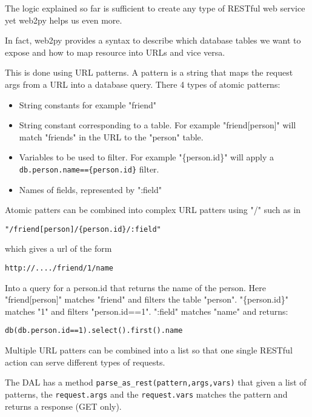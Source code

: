 \documentclass[justified,sixbynine,notoc]{tufte-book}
\def\ft{\small\tt}
\def\inxx#1{\index{#1}}
\begin{document}
\begin{fullwidth}
The logic explained so far is sufficient to create any type of RESTful web service yet web2py helps us even more.

In fact, web2py provides a syntax to describe which database tables we want to expose and how to map resource into URLs and vice versa.

\inxx{parse\_as\_rest}

This is done using URL patterns.
A pattern is a string that maps the request args from a URL into a database query.
There 4 types of atomic patterns:

\begin{itemize}
\item String constants for example "friend"

\item String constant corresponding to a table. For example "friend[person]" will match "friends" in the URL to the "person" table.

\item Variables to be used to filter. For example "\{person.id\}" will apply a {\ft db.person.name==\{person.id\}} filter.

\item Names of fields, represented by ":field"
\end{itemize}

Atomic patters can be combined into complex URL patters using "/" such as in

\begin{lstlisting}
"/friend[person]/{person.id}/:field"
\end{lstlisting}
\noindent which gives a url of the form

\begin{lstlisting}[keywords={}]
http://..../friend/1/name
\end{lstlisting}

Into a query for a person.id that returns the name of the person. Here "friend[person]" matches "friend" and filters the table "person". "\{person.id\}" matches "1" and filters "person.id==1". ":field" matches "name" and returns:

\begin{lstlisting}
db(db.person.id==1).select().first().name
\end{lstlisting}

Multiple URL patters can be combined into a list so that one single RESTful action can serve different types of requests.

The DAL has a method {\ft parse\_as\_rest(pattern,args,vars)} that given a list of patterns, the {\ft request.args} and the {\ft request.vars} matches the pattern and returns a response (GET only).


\end{fullwidth}
\end{document}
